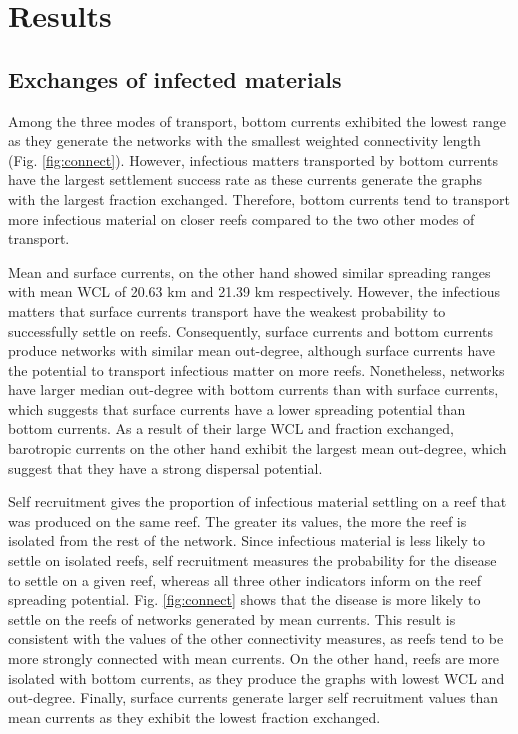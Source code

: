\documentclass[utf8]{frontiersSCNS}
\begin{document}
\section{Results}

\subsection{Exchanges of infected materials}

Among the three modes of transport, bottom currents exhibited the lowest range as they generate the networks with the smallest weighted connectivity length (Fig. \ref{fig:connect}). However, infectious matters transported by bottom currents have the largest settlement success rate as these currents generate the graphs with the largest fraction exchanged. Therefore, bottom currents tend to transport more infectious material on closer reefs compared to the two other modes of transport.

Mean and surface currents, on the other hand showed similar spreading ranges with mean WCL of 20.63 km and 21.39 km respectively. However, the infectious matters that surface currents transport have the weakest probability to successfully settle on reefs. Consequently, surface currents and bottom currents produce networks with similar mean out-degree, although surface currents have the potential to transport infectious matter on more reefs. Nonetheless, networks have larger median out-degree with bottom currents than with surface currents, which suggests that surface currents have a lower spreading potential than bottom currents. As a result of their large WCL and fraction exchanged, barotropic currents on the other hand exhibit the largest mean out-degree, which suggest that they have a strong dispersal potential. 

Self recruitment gives the proportion of infectious material settling on a reef that was produced on the same reef. The greater its values, the more the reef is isolated from the rest of the network. Since infectious material is less likely to settle on isolated reefs, self recruitment measures the probability for the disease to settle on a given reef, whereas all three other indicators inform on the reef spreading potential. Fig. \ref{fig:connect} shows that the disease is more likely to settle on the reefs of networks generated by mean currents. This result is consistent with the values of the other connectivity measures, as reefs tend to be more strongly connected with mean currents. On the other hand, reefs are more isolated with bottom currents, as they produce the graphs with lowest WCL and out-degree. Finally, surface currents generate larger self recruitment values than mean currents as they exhibit the lowest fraction exchanged. 
\end{document}
